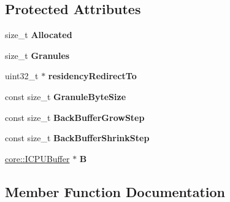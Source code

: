 \subsection*{Protected Attributes}
\begin{DoxyCompactItemize}
\item 
size\+\_\+t {\bfseries Allocated}\hypertarget{classirr_1_1core_1_1IMetaGranularBuffer_a442d6eca3b37b144613f5dd00c460c54}{}\label{classirr_1_1core_1_1IMetaGranularBuffer_a442d6eca3b37b144613f5dd00c460c54}

\item 
size\+\_\+t {\bfseries Granules}\hypertarget{classirr_1_1core_1_1IMetaGranularBuffer_a11b06d843a11bca67e291476c4a157e9}{}\label{classirr_1_1core_1_1IMetaGranularBuffer_a11b06d843a11bca67e291476c4a157e9}

\item 
uint32\+\_\+t $\ast$ {\bfseries residency\+Redirect\+To}\hypertarget{classirr_1_1core_1_1IMetaGranularBuffer_aebf9a9512a50f8c8685788f6bab0dec1}{}\label{classirr_1_1core_1_1IMetaGranularBuffer_aebf9a9512a50f8c8685788f6bab0dec1}

\item 
const size\+\_\+t {\bfseries Granule\+Byte\+Size}\hypertarget{classirr_1_1core_1_1IMetaGranularBuffer_a8f9abf4ce149ef18375b067c1e1139c6}{}\label{classirr_1_1core_1_1IMetaGranularBuffer_a8f9abf4ce149ef18375b067c1e1139c6}

\item 
const size\+\_\+t {\bfseries Back\+Buffer\+Grow\+Step}\hypertarget{classirr_1_1core_1_1IMetaGranularBuffer_a3f64f1fbe9751c256b6b393077e7de8a}{}\label{classirr_1_1core_1_1IMetaGranularBuffer_a3f64f1fbe9751c256b6b393077e7de8a}

\item 
const size\+\_\+t {\bfseries Back\+Buffer\+Shrink\+Step}\hypertarget{classirr_1_1core_1_1IMetaGranularBuffer_a8dc4bc7da4525315648f1170b78afae6}{}\label{classirr_1_1core_1_1IMetaGranularBuffer_a8dc4bc7da4525315648f1170b78afae6}

\item 
\hyperlink{classirr_1_1core_1_1ICPUBuffer}{core\+::\+I\+C\+P\+U\+Buffer} $\ast$ {\bfseries B}\hypertarget{classirr_1_1core_1_1IMetaGranularBuffer_af9bdbf0de5af5cbce948285e3cbb2e33}{}\label{classirr_1_1core_1_1IMetaGranularBuffer_af9bdbf0de5af5cbce948285e3cbb2e33}

\end{DoxyCompactItemize}


\subsection{Member Function Documentation}
